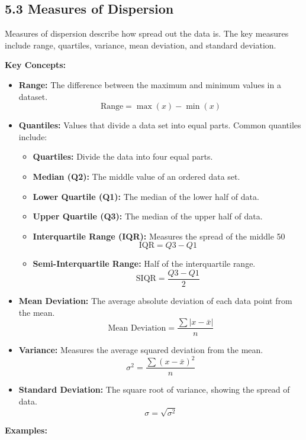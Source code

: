 
\subsection*{5.3 Measures of Dispersion}
Measures of dispersion describe how spread out the data is. The key measures include range, quartiles, variance, mean deviation, and standard deviation.

\textbf{Key Concepts:}
\begin{itemize}
	\item \textbf{Range:} The difference between the maximum and minimum values in a dataset.
	\[
	\text{Range} = \max(x) - \min(x)
	\]
	
	\item \textbf{Quantiles:} Values that divide a data set into equal parts. Common quantiles include:
	\begin{itemize}
		\item \textbf{Quartiles:} Divide the data into four equal parts.
		\item \textbf{Median (Q2):} The middle value of an ordered data set.
		\item \textbf{Lower Quartile (Q1):} The median of the lower half of data.
		\item \textbf{Upper Quartile (Q3):} The median of the upper half of data.
		\item \textbf{Interquartile Range (IQR):} Measures the spread of the middle 50%
		\[
		\text{IQR} = Q3 - Q1
		\]
		\item \textbf{Semi-Interquartile Range:} Half of the interquartile range.
		\[
		\text{SIQR} = \frac{Q3 - Q1}{2}
		\]
	\end{itemize}
	
	\item \textbf{Mean Deviation:} The average absolute deviation of each data point from the mean.
	\[
	\text{Mean Deviation} = \frac{\sum |x - \bar{x}|}{n}
	\]
	
	\item \textbf{Variance:} Measures the average squared deviation from the mean.
	\[
	\sigma^2 = \frac{\sum (x - \bar{x})^2}{n}
	\]
	
	\item \textbf{Standard Deviation:} The square root of variance, showing the spread of data.
	\[
	\sigma = \sqrt{\sigma^2}
	\]
\end{itemize}

\textbf{Examples:}

